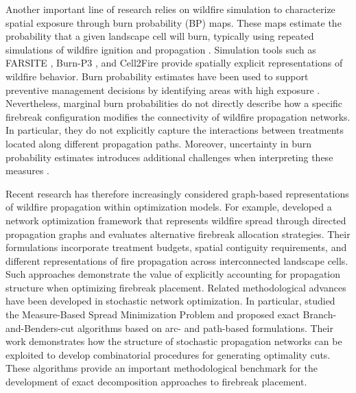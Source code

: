 \documentclass{itor}
\begin{document}
Another important line of research relies on wildfire
simulation to characterize spatial exposure through
burn probability (BP) maps. These maps estimate the
probability that a given landscape cell will burn,
typically using repeated simulations of wildfire
ignition and propagation
\citep{parisien2005mapping,finney2005challenge}.
Simulation tools such as FARSITE \citep{finney1998farsite},
Burn-P3 \citep{parisien2005mapping}, and Cell2Fire
\citep{pais2021cell2fire} provide spatially explicit
representations of wildfire behavior. Burn probability
estimates have been used to support preventive management
decisions by identifying areas with high exposure
\citep{ager2010comparison,oliveira2016assessing}.
Nevertheless, marginal burn probabilities do not directly
describe how a specific firebreak configuration modifies
the connectivity of wildfire propagation networks.
In particular, they do not explicitly capture the
interactions between treatments located along different
propagation paths. Moreover, uncertainty in burn
probability estimates introduces additional challenges
when interpreting these measures
\citep{kuhlmann2015generating}.

Recent research has therefore increasingly considered
graph-based representations of wildfire propagation
within optimization models. For example,
\citet{yemshanov2025graph} developed a network optimization
framework that represents wildfire spread through
directed propagation graphs and evaluates alternative
firebreak allocation strategies. Their formulations
incorporate treatment budgets, spatial contiguity
requirements, and different representations of fire
propagation across interconnected landscape cells.
Such approaches demonstrate the value of explicitly
accounting for propagation structure when optimizing
firebreak placement. Related methodological advances have been developed
in stochastic network optimization. In particular,
\citet{taninmics2024benders} studied the Measure-Based
Spread Minimization Problem and proposed exact
Branch-and-Benders-cut algorithms based on arc- and
path-based formulations. Their work demonstrates how
the structure of stochastic propagation networks can
be exploited to develop combinatorial procedures for
generating optimality cuts. These algorithms provide
an important methodological benchmark for the
development of exact decomposition approaches to
firebreak placement.
\end{document}

